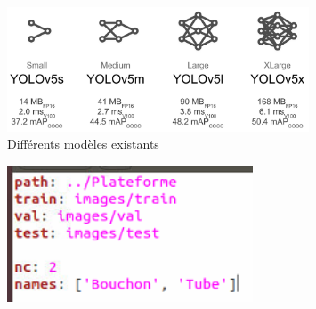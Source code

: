 \documentclass[12pt]{beamer}
\begin{document}
    \begin{frame}[allowframebreaks]    
	    \begin{figure}
		    \centering
		    \includegraphics[width=0.8\textwidth]{image/yolov5.png}
		    \caption*{\label{fig:modeleYolov5}Différents modèles existants}
	    \end{figure}
	    
	    \begin{figure}
		    \centering
		    \includegraphics[width=0.65\textwidth]{image/yaml.png}
	    \end{figure}
	\end{frame}
\end{document}
